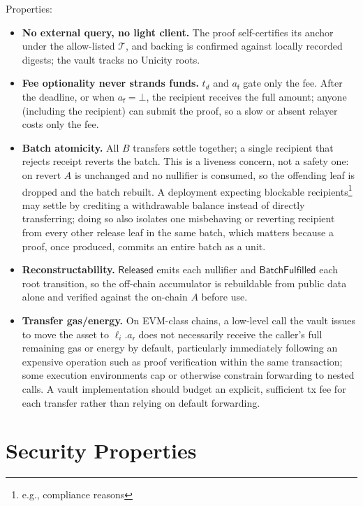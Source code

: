 Properties:
\begin{itemize}
  \item \textbf{No external query, no light client.} The proof self-certifies its anchor under the allow-listed $\mathcal{T}$, and backing is confirmed against locally recorded digests; the vault tracks no Unicity roots.
  \item \textbf{Fee optionality never strands funds.} $t_d$ and $a_\mathsf{f}$ gate only the fee. After the deadline, or when $a_\mathsf{f}=\bot$, the recipient receives the full amount; anyone (including the recipient) can submit the proof, so a slow or absent relayer costs only the fee.
  \item \textbf{Batch atomicity.} All $B$ transfers settle together; a single recipient that rejects receipt reverts the batch. This is a liveness concern, not a safety one: on revert $A$ is unchanged and no nullifier is consumed, so the offending leaf is dropped and the batch rebuilt. A deployment expecting blockable recipients\footnote{e.g., compliance reasons} may settle by crediting a withdrawable balance instead of directly transferring; doing so also isolates one misbehaving or reverting recipient from every other release leaf in the same batch, which matters because a proof, once produced, commits an entire batch as a unit.
  \item \textbf{Reconstructability.} $\mathsf{Released}$ emits each nullifier and $\mathsf{BatchFulfilled}$ each root transition, so the off-chain accumulator is rebuildable from public data alone and verified against the on-chain $A$ before use.
  \item \textbf{Transfer gas/energy.} On EVM-class chains, a low-level call the vault issues to move the asset to $\ell_i.a_\mathsf{r}$ does not necessarily receive the caller's full remaining gas or energy by default, particularly immediately following an expensive operation such as proof verification within the same transaction; some execution environments cap or otherwise constrain forwarding to nested calls. A vault implementation should budget an explicit, sufficient tx fee for each transfer rather than relying on default forwarding.
\end{itemize}

\section{Security Properties}\label{app:bridging-security}

